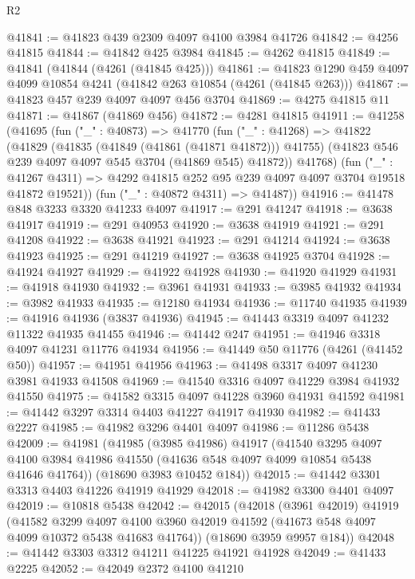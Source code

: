\begin{lexlean}{R2}
\begin{coremodule}
@41841 := @41823 @439 @2309 @4097 @4100 @3984 @41726
@41842 := @4256 @41815
@41844 := @41842 @425 @3984
@41845 := @4262 @41815
@41849 := @41841 (@41844 (@4261 (@41845 @425)))
@41861 := @41823 @1290 @459 @4097 @4099 @10854 @4241 (@41842 @263 @10854 (@4261 (@41845 @263)))
@41867 := @41823 @457 @239 @4097 @4097 @456 @3704
@41869 := @4275 @41815 @11
@41871 := @41867 (@41869 @456)
@41872 := @4281 @41815
@41911 := @41258
    (@41695
      (fun ("_" : @40873) =>
      @41770
        (fun ("_" : @41268) =>
        @41822
          (@41829
            (@41835 (@41849 (@41861 (@41871 @41872))) @41755)
            (@41823 @546 @239 @4097 @4097 @545 @3704 (@41869 @545) @41872))
          @41768)
        (fun ("_" : @41267 @4311) =>
        @4292 @41815 @252 @95 @239 @4097 @4097 @3704 @19518 @41872 @19521))
      (fun ("_" : @40872 @4311) => @41487))
@41916 := @41478 @848 @3233 @3320 @41233 @4097
@41917 := @291 @41247
@41918 := @3638 @41917
@41919 := @291 @40953
@41920 := @3638 @41919
@41921 := @291 @41208
@41922 := @3638 @41921
@41923 := @291 @41214
@41924 := @3638 @41923
@41925 := @291 @41219
@41927 := @3638 @41925 @3704
@41928 := @41924 @41927
@41929 := @41922 @41928
@41930 := @41920 @41929
@41931 := @41918 @41930
@41932 := @3961 @41931
@41933 := @3985 @41932
@41934 := @3982 @41933
@41935 := @12180 @41934
@41936 := @11740 @41935
@41939 := @41916 @41936 (@3837 @41936)
@41945 := @41443 @3319 @4097 @41232 @11322 @41935 @41455
@41946 := @41442 @247
@41951 := @41946 @3318 @4097 @41231 @11776 @41934
@41956 := @41449 @50 @11776 (@4261 (@41452 @50))
@41957 := @41951 @41956
@41963 := @41498 @3317 @4097 @41230 @3981 @41933 @41508
@41969 := @41540 @3316 @4097 @41229 @3984 @41932 @41550
@41975 := @41582 @3315 @4097 @41228 @3960 @41931 @41592
@41981 := @41442 @3297 @3314 @4403 @41227 @41917 @41930
@41982 := @41433 @2227
@41985 := @41982 @3296 @4401 @4097
@41986 := @11286 @5438
@42009 := @41981
    (@41985
      (@3985 @41986)
      @41917
      (@41540
        @3295
        @4097
        @4100
        @3984
        @41986
        @41550
        (@41636 @548 @4097 @4099 @10854 @5438 @41646 @41764))
      (@18690 @3983 @10452 @184))
@42015 := @41442 @3301 @3313 @4403 @41226 @41919 @41929
@42018 := @41982 @3300 @4401 @4097
@42019 := @10818 @5438
@42042 := @42015
    (@42018
      (@3961 @42019)
      @41919
      (@41582
        @3299
        @4097
        @4100
        @3960
        @42019
        @41592
        (@41673 @548 @4097 @4099 @10372 @5438 @41683 @41764))
      (@18690 @3959 @9957 @184))
@42048 := @41442 @3303 @3312 @41211 @41225 @41921 @41928
@42049 := @41433 @2225
@42052 := @42049 @2372 @4100 @41210

\end{coremodule}
\end{lexlean}
